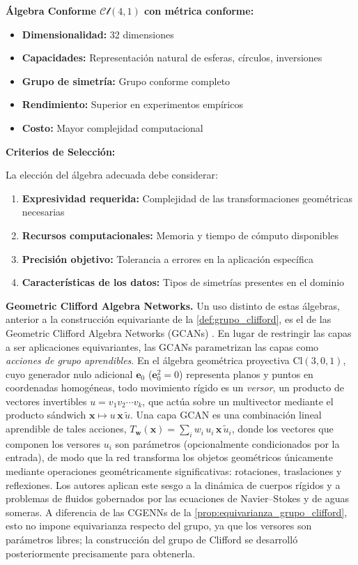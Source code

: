 \textbf{Álgebra Conforme $\mathcal{Cl}(4,1)$ con métrica conforme:}
\begin{itemize}
    \item \textbf{Dimensionalidad:} 32 dimensiones
    \item \textbf{Capacidades:} Representación natural de esferas, círculos, inversiones
    \item \textbf{Grupo de simetría:} Grupo conforme completo
    \item \textbf{Rendimiento:} Superior en experimentos empíricos
    \item \textbf{Costo:} Mayor complejidad computacional
\end{itemize}

\textbf{Criterios de Selección:}

La elección del álgebra adecuada debe considerar:
\begin{enumerate}
    \item \textbf{Expresividad requerida:} Complejidad de las transformaciones geométricas necesarias
    \item \textbf{Recursos computacionales:} Memoria y tiempo de cómputo disponibles
    \item \textbf{Precisión objetivo:} Tolerancia a errores en la aplicación específica
    \item \textbf{Características de los datos:} Tipos de simetrías presentes en el dominio
\end{enumerate}

\textbf{Geometric Clifford Algebra Networks.} Un uso distinto de estas álgebras, anterior a la construcción equivariante de la \autoref{def:grupo_clifford}, es el de las Geometric Clifford Algebra Networks (GCANs) \citep{ruhe2023geometriccliffordnets}. En lugar de restringir las capas a ser aplicaciones equivariantes, las GCANs parametrizan las capas como \emph{acciones de grupo aprendibles}. En el álgebra geométrica proyectiva $\text{Cl}(3,0,1)$, cuyo generador nulo adicional $\mathbf{e}_0$ ($\mathbf{e}_0^2 = 0$) representa planos y puntos en coordenadas homogéneas, todo movimiento rígido es un \emph{versor}, un producto de vectores invertibles $u = v_1 v_2 \cdots v_k$, que actúa sobre un multivector mediante el producto sándwich $\mathbf{x} \mapsto u\,\mathbf{x}\,\tilde{u}$. Una capa GCAN es una combinación lineal aprendible de tales acciones, $T_{\mathbf{w}}(\mathbf{x}) = \sum_i w_i\, u_i\,\mathbf{x}\,\tilde{u}_i$, donde los vectores que componen los versores $u_i$ son parámetros (opcionalmente condicionados por la entrada), de modo que la red transforma los objetos geométricos únicamente mediante operaciones geométricamente significativas: rotaciones, traslaciones y reflexiones. Los autores aplican este sesgo a la dinámica de cuerpos rígidos y a problemas de fluidos gobernados por las ecuaciones de Navier--Stokes y de aguas someras. A diferencia de las CGENNs de la \autoref{prop:equivarianza_grupo_clifford}, esto no impone equivarianza respecto del grupo, ya que los versores son parámetros libres; la construcción del grupo de Clifford se desarrolló posteriormente precisamente para obtenerla.

